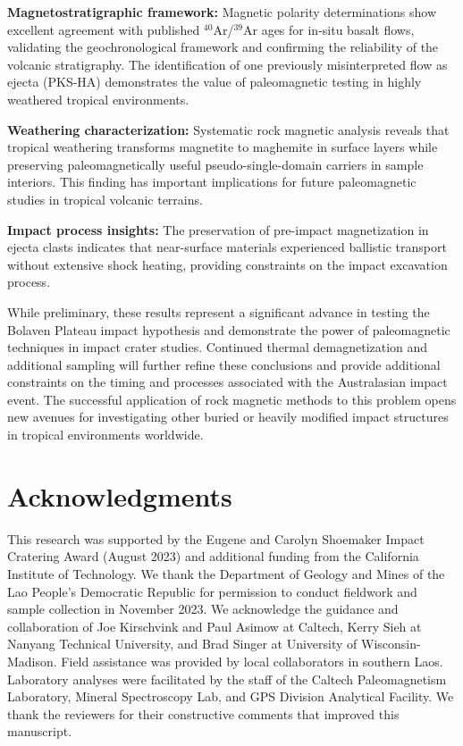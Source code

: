\documentclass[twocolumn,11pt]{article}
\begin{document}
\textbf{Magnetostratigraphic framework:} Magnetic polarity determinations show excellent agreement with published $^{40}$Ar/$^{39}$Ar ages for in-situ basalt flows, validating the geochronological framework and confirming the reliability of the volcanic stratigraphy. The identification of one previously misinterpreted flow as ejecta (PKS-HA) demonstrates the value of paleomagnetic testing in highly weathered tropical environments.

\textbf{Weathering characterization:} Systematic rock magnetic analysis reveals that tropical weathering transforms magnetite to maghemite in surface layers while preserving paleomagnetically useful pseudo-single-domain carriers in sample interiors. This finding has important implications for future paleomagnetic studies in tropical volcanic terrains.

\textbf{Impact process insights:} The preservation of pre-impact magnetization in ejecta clasts indicates that near-surface materials experienced ballistic transport without extensive shock heating, providing constraints on the impact excavation process.

While preliminary, these results represent a significant advance in testing the Bolaven Plateau impact hypothesis and demonstrate the power of paleomagnetic techniques in impact crater studies. Continued thermal demagnetization and additional sampling will further refine these conclusions and provide additional constraints on the timing and processes associated with the Australasian impact event. The successful application of rock magnetic methods to this problem opens new avenues for investigating other buried or heavily modified impact structures in tropical environments worldwide.

\section{Acknowledgments}

This research was supported by the Eugene and Carolyn Shoemaker Impact Cratering Award (August 2023) and additional funding from the California Institute of Technology. We thank the Department of Geology and Mines of the Lao People's Democratic Republic for permission to conduct fieldwork and sample collection in November 2023. We acknowledge the guidance and collaboration of Joe Kirschvink and Paul Asimow at Caltech, Kerry Sieh at Nanyang Technical University, and Brad Singer at University of Wisconsin-Madison. Field assistance was provided by local collaborators in southern Laos. Laboratory analyses were facilitated by the staff of the Caltech Paleomagnetism Laboratory, Mineral Spectroscopy Lab, and GPS Division Analytical Facility. We thank the reviewers for their constructive comments that improved this manuscript.




\end{document}
